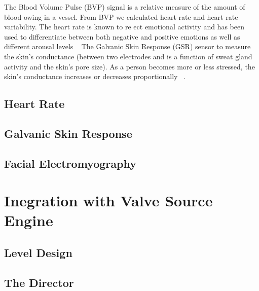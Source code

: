 The Blood Volume Pulse (BVP) signal is a relative measure of the amount of blood owing in a vessel. From BVP we calculated heart rate and heart rate variability. The heart rate is known to re ect emotional activity and has been used to differentiate between both negative and positive emotions as well as different arousal levels ~\cite{tt2013procomp} The Galvanic Skin Response (GSR) sensor to measure the skin's conductance (between two electrodes and is a function of sweat gland activity and the skin's pore size). As a person becomes more or less stressed, the skin's conductance increases or decreases proportionally ~\cite{picard2003affective}.

\subsection{Heart Rate}
\subsection{Galvanic Skin Response}
\subsection{Facial Electromyography}


\section{Inegration with Valve Source Engine}
\subsection{Level Design}
\subsection{The Director}
